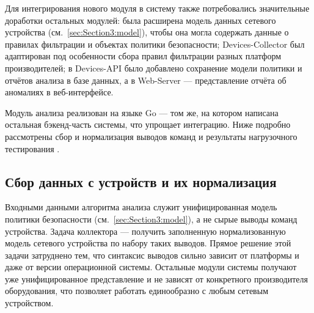 Для интегрирования нового модуля в систему также потребовались значительные доработки остальных модулей: была расширена модель данных сетевого устройства (см.~\ref{sec:Section3:model}), чтобы она могла содержать данные о правилах фильтрации и объектах политики безопасности; Devices-Collector был адаптирован под особенности сбора правил фильтрации разных платформ производителей; в Devices-API было добавлено сохранение модели политики и отчётов анализа в базе данных, а в Web-Server --- представление отчёта об аномалиях в веб-интерфейсе.

Модуль анализа реализован на языке Go --- том же, на котором написана остальная бэкенд-часть системы, что упрощает интеграцию. Ниже подробно рассмотрены сбор и нормализация выводов команд и результаты нагрузочного тестирования .

\subsection{Сбор данных с устройств и их нормализация}
\label{sec:Section4:collector}

Входными данными алгоритма анализа служит унифицированная модель политики безопасности (см.~\ref{sec:Section3:model}), а не сырые выводы команд устройства. Задача коллектора --- получить заполненную нормализованную модель сетевого устройства по набору таких выводов. Прямое решение этой задачи затруднено тем, что синтаксис выводов сильно зависит от платформы и даже от версии операционной системы. Остальные модули системы получают уже унифицированное представление и не зависят от конкретного производителя оборудования, что позволяет работать единообразно с любым сетевым устройством.


